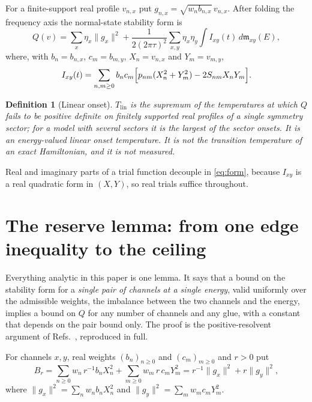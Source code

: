 \documentclass[aps,10pt,superscriptaddress,floatfix,amsmath,amssymb,nofootinbib]{revtex4-2}
\newcommand{\Tlin}{T_{\mathrm{lin}}}
\newcommand{\mm}{\mathfrak m}
\newtheorem{definition}{Definition}
\begin{document}
For a finite-support real profile $v_{n,x}$ put $g_{n,x}=\sqrt{w_nb_{n,x}}\,v_{n,x}$.
After folding the frequency axis the normal-state stability form is
\begin{equation}\label{eq:form}
Q(v)=\sum_x\eta_x\|g_x\|^{2}
+\frac{1}{2(2\pi\tau)^{2}}\sum_{x,y}\eta_x\eta_y\int I_{xy}(t)\,d\mm_{xy}(E),
\end{equation}
where, with $b_n=b_{n,x}$, $c_m=b_{m,y}$, $X_n=v_{n,x}$ and $Y_m=v_{m,y}$,
\begin{equation}\label{eq:Ixy}
I_{xy}(t)=\sum_{n,m\ge0}b_nc_m\Bigl[p_{nm}(X_n^{2}+Y_m^{2})-2S_{nm}X_nY_m\Bigr].
\end{equation}

\begin{definition}[Linear onset]\label{def:onset}
$\Tlin$ is the supremum of the temperatures at which $Q$ fails to be positive definite on
finitely supported real profiles of a single symmetry sector; for a model with several
sectors it is the largest of the sector onsets. It is an energy-valued linear onset
temperature. It is not the transition temperature of an exact Hamiltonian, and it is not
measured.
\end{definition}

Real and imaginary parts of a trial function decouple in \eqref{eq:form}, because
$I_{xy}$ is a real quadratic form in $(X,Y)$, so real trials suffice throughout.

\section{The reserve lemma: from one edge inequality to the ceiling}\label{sec:reserve}

Everything analytic in this paper is one lemma. It says that a bound on the stability form
for a \emph{single pair of channels at a single energy}, valid uniformly over the admissible
weights, the imbalance between the two channels and the energy, implies a bound on $Q$ for
any number of channels and any glue, with a constant that depends on the pair bound only.
The proof is the positive-resolvent argument of Refs.~\cite{finiteenergy,anisosharp},
reproduced in full.

For channels $x,y$, real weights $(b_n)_{n\ge0}$ and $(c_m)_{m\ge0}$ and $r>0$ put
\begin{equation}\label{eq:Br}
B_r=\sum_{n\ge0}w_n\,r^{-1}b_nX_n^{2}+\sum_{m\ge0}w_m\,r\,c_mY_m^{2}
=r^{-1}\|g_x\|^{2}+r\|g_y\|^{2},
\end{equation}
where $\|g_x\|^{2}=\sum_nw_nb_nX_n^{2}$ and $\|g_y\|^{2}=\sum_mw_mc_mY_m^{2}$.
\end{document}
